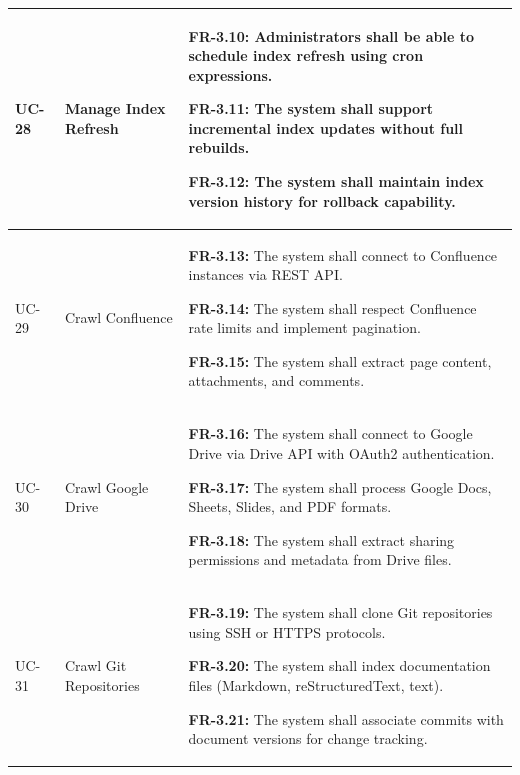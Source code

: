 \begin{longtable}{|>{\raggedright\arraybackslash}p{}|>{\raggedright\arraybackslash}p{}|>{\raggedright\arraybackslash}p{}|}
UC-28 & Manage Index Refresh &
\begin{frequirements}
\item \textbf{FR-3.10:} Administrators shall be able to schedule index refresh using cron expressions.
\item \textbf{FR-3.11:} The system shall support incremental index updates without full rebuilds.
\item \textbf{FR-3.12:} The system shall maintain index version history for rollback capability.
\end{frequirements} \\
\hline

UC-29 & Crawl Confluence &
\begin{frequirements}
\item \textbf{FR-3.13:} The system shall connect to Confluence instances via REST API.
\item \textbf{FR-3.14:} The system shall respect Confluence rate limits and implement pagination.
\item \textbf{FR-3.15:} The system shall extract page content, attachments, and comments.
\end{frequirements} \\
\hline

UC-30 & Crawl Google Drive &
\begin{frequirements}
\item \textbf{FR-3.16:} The system shall connect to Google Drive via Drive API with OAuth2 authentication.
\item \textbf{FR-3.17:} The system shall process Google Docs, Sheets, Slides, and PDF formats.
\item \textbf{FR-3.18:} The system shall extract sharing permissions and metadata from Drive files.
\end{frequirements} \\
\hline

UC-31 & Crawl Git Repositories &
\begin{frequirements}
\item \textbf{FR-3.19:} The system shall clone Git repositories using SSH or HTTPS protocols.
\item \textbf{FR-3.20:} The system shall index documentation files (Markdown, reStructuredText, text).
\item \textbf{FR-3.21:} The system shall associate commits with document versions for change tracking.
\end{frequirements} \\
\hline


\end{longtable}
